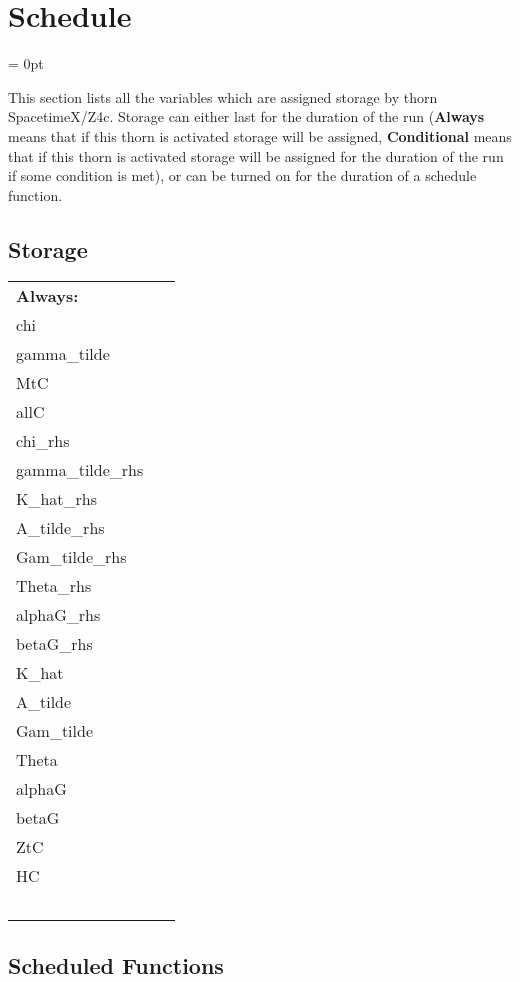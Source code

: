 
\section{Schedule} 


\parskip = 0pt


\noindent This section lists all the variables which are assigned storage by thorn SpacetimeX/Z4c.  Storage can either last for the duration of the run ({\bf Always} means that if this thorn is activated storage will be assigned, {\bf Conditional} means that if this thorn is activated storage will be assigned for the duration of the run if some condition is met), or can be turned on for the duration of a schedule function.


\subsection*{Storage}

\hspace{5mm}

 \begin{tabular*}{160mm}{ll} 

{\bf Always:}&  ~ \\ 
 chi & ~\\ 
 gamma\_tilde & ~\\ 
 MtC & ~\\ 
 allC & ~\\ 
 chi\_rhs & ~\\ 
 gamma\_tilde\_rhs & ~\\ 
 K\_hat\_rhs & ~\\ 
 A\_tilde\_rhs & ~\\ 
 Gam\_tilde\_rhs & ~\\ 
 Theta\_rhs & ~\\ 
 alphaG\_rhs & ~\\ 
 betaG\_rhs & ~\\ 
 K\_hat & ~\\ 
 A\_tilde & ~\\ 
 Gam\_tilde & ~\\ 
 Theta & ~\\ 
 alphaG & ~\\ 
 betaG & ~\\ 
 ZtC & ~\\ 
 HC & ~\\ 
~ & ~\\ 
\end{tabular*} 


\subsection*{Scheduled Functions}
\vspace{5mm}

